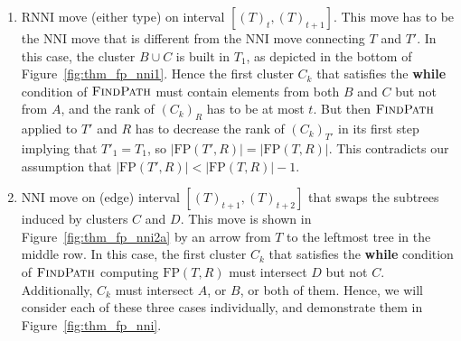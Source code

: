 \documentclass[11pt]{amsart}
\newcommand{\rnni}{\mathrm{RNNI}}
\newcommand{\findpath}{\textsc{FindPath}}
\newcommand{\nni}{\mathrm{NNI}}
\newcommand{\fp}{\mathrm{FP}}
\begin{document}
\begin{enumerate}[label = 1.{\arabic*}]
\item $\rnni$ move (either type) on interval $[(T)_t, (T)_{t+1}]$.
This move has to be the $\nni$ move that is different from the $\nni$ move connecting $T$ and $T'$.
In this case, the cluster $B \cup C$ is built in $T_1$, as depicted in the bottom of Figure~\ref{fig:thm_fp_nni1}.
Hence the first cluster $C_k$ that satisfies the \textbf{while} condition of $\findpath$ must contain elements from both $B$ and $C$ but not from $A$, and the rank of $(C_k)_R$ has to be at most $t$.
But then $\findpath$ applied to $T'$ and $R$ has to decrease the rank of $(C_k)_{T'}$ in its first step implying that $T'_1 = T_1$, so $|\fp(T',R)| = |\fp(T,R)|$.
This contradicts our assumption that $|\fp(T',R)| < |\fp(T,R)| - 1$.

\item $\nni$ move on (edge) interval $[(T)_{t+1}, (T)_{t+2}]$ that swaps the subtrees induced by clusters $C$ and $D$.
This move is shown in Figure~\ref{fig:thm_fp_nni2a} by an arrow from $T$ to the leftmost tree in the middle row.
In this case, the first cluster $C_k$ that satisfies the \textbf{while} condition of $\findpath$ computing $\fp(T, R)$ must intersect $D$ but not $C$.
Additionally, $C_k$ must intersect $A$, or $B$, or both of them.
Hence, we will consider each of these three cases individually, and demonstrate them in Figure~\ref{fig:thm_fp_nni}.


\end{enumerate}
\end{document}
